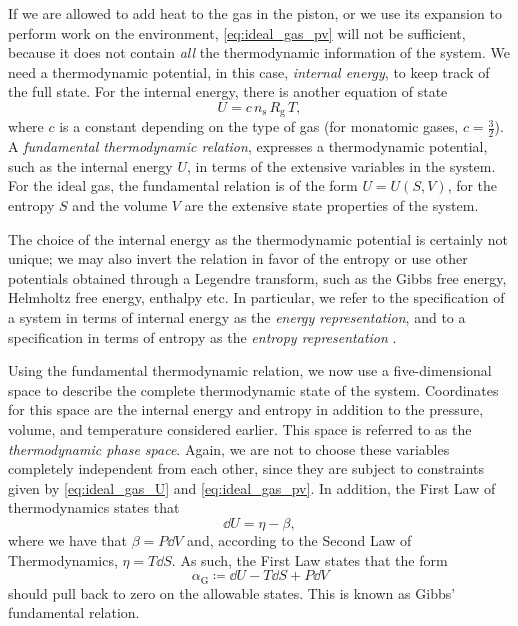 If we are allowed to add heat to the gas in the piston, or we use its expansion to perform work on the environment, \cref{eq:ideal_gas_pv} will not be sufficient, because it does not contain \emph{all} the thermodynamic information of the system. We need a thermodynamic potential, in this case, \emph{internal energy}, to keep track of the full state. For the internal energy, there is another equation of state \cite{Callen1985}
\begin{equation}
    U = c\, n_\text{s}\, R_\text{g}\, T,
    \label{eq:ideal_gas_U}
\end{equation}
where $c$ is a constant depending on the type of gas (for monatomic gases, $c = \tfrac{3}{2}$).
A \emph{fundamental thermodynamic relation}, expresses a thermodynamic potential, such as the internal energy $U$, in terms of the extensive variables in the system. For the ideal gas, the fundamental relation is of the form $U = U(S, V)$, for the entropy $S$ and the volume $V$ are the extensive state properties of the system. 

The choice of the internal energy as the thermodynamic potential is certainly not unique; we may also invert the relation in favor of the entropy or use other potentials obtained through a Legendre transform, such as the Gibbs free energy, Helmholtz free energy, enthalpy etc. In particular, we refer to the specification of a system in terms of internal energy as the \emph{energy representation}, and to a specification in terms of entropy as the \emph{entropy representation} \cite{VanderSchaft2021a}.

Using the fundamental thermodynamic relation, we now use a five-dimensional space to describe the complete thermodynamic state of the system. Coordinates for this space are the internal energy and entropy in addition to the pressure, volume, and temperature considered earlier. This space is referred to as the \emph{thermodynamic phase space}. Again, we are not to choose these variables completely independent from each other, since they are subject to constraints given by \cref{eq:ideal_gas_U} and \cref{eq:ideal_gas_pv}. In addition, the First Law of thermodynamics states that
$$ \dd{U} = \eta - \beta, $$
where we have that $ \beta = P\dd{V} $ and, according to the Second Law of Thermodynamics, $\eta = T\dd{S}$. As such, the First Law states that the form
\begin{equation} 
    \alpha_\text{G} \coloneq \dd{U} - T\dd{S} + P\dd{V}
    \label{eq:gibbs_relation}
\end{equation}
should pull back to zero on the allowable states. This is known as Gibbs' fundamental relation. 

